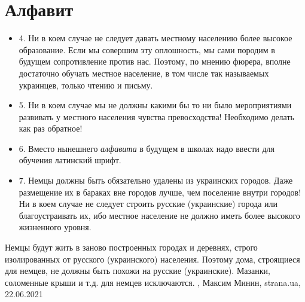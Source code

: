  
 
 
 
 
\chapter{Алфавит}

\begin{itemize}
\item 4. Ни в коем случае не следует давать местному населению более высокое образование. Если мы совершим эту оплошность, мы сами породим в будущем сопротивление против нас. Поэтому, по мнению фюрера, вполне достаточно обучать местное население, в том числе так называемых украинцев, только чтению и письму.
\item 5. Ни в коем случае мы не должны какими бы то ни было мероприятиями развивать у местного населения чувства превосходства! Необходимо делать как раз обратное!
\item 6. Вместо нынешнего \emph{алфавита} в будущем в школах надо ввести для обучения латинский шрифт.
\item 7. Немцы должны быть обязательно удалены из украинских городов. Даже размещение их в бараках вне городов лучше, чем поселение внутри городов! Ни в коем случае не следует строить русские (украинские) города или благоустраивать их, ибо местное население не должно иметь более высокого жизненного уровня.
\end{itemize}
Немцы будут жить в заново построенных городах и деревнях, строго изолированных
от русского (украинского) населения. Поэтому дома, строящиеся для немцев, не
должны быть похожи на русские (украинские). Мазанки, соломенные крыши и т.д.
для немцев исключаются.
 , Максим Минин, strana.ua, 22.06.2021



